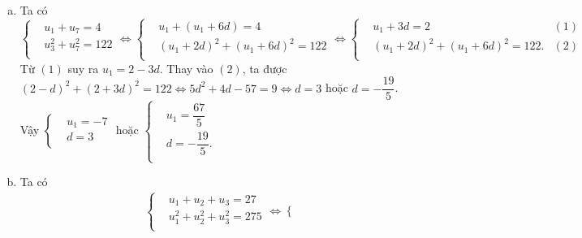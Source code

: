 \begin{bt}
{\begin{enumerate}[a)]
			Vậy $\left\{\begin{aligned} 
				&u_1=-1 \\
				&d=4 \\
			\end{aligned}\right. $ hoặc $\left\{\begin{aligned} 
				&u_1=7 \\
				&d=-4. \\
			\end{aligned}\right. $ 
			\item Ta có\\ $\left\{\begin{aligned} 
				&u_1+u_7=4 \\
				&u_3^2+u_7^2=122 \\
			\end{aligned}\right. \Leftrightarrow \left\{\begin{aligned} 
				&u_1+(u_1+6d)=4 \\
				&{(u_1+2d)}^2+{(u_1+6d)}^2=122 \\
			\end{aligned}\right. \Leftrightarrow \left\{\begin{aligned}& u_1+3d=2 & (1) \\ & {(u_1+2d)}^2+{(u_1+6d)}^2=122. & (2) \\ \end{aligned}\right. $\\
			Từ $(1)$ suy ra $u_1=2-3d$. Thay vào $(2)$, ta được \\
			$(2-d)^2+(2+3d)^2=122 \Leftrightarrow 5d^2+4d-57=9 \Leftrightarrow d=3$ hoặc $d=-\dfrac{19}{5}$. \\
			Vậy $\left\{\begin{aligned} 
				&u_1=-7 \\
				&d=3 \\
			\end{aligned}\right. $ hoặc $\left\{\begin{aligned} 
				&u_1=\dfrac{67}{5} \\
				&d=-\dfrac{19}{5}. \\
			\end{aligned}\right. $ 
			\item Ta có
			\begin{eqnarray*}
				& &    \left\{\begin{aligned} 
					&u_1+u_2+u_3=27 \\
					&u_1^2+u_2^2+u_3^2=275 \\
				\end{aligned}\right. \Leftrightarrow \left\{\begin{aligned} 

\end{aligned}
\end{eqnarray*}
\end{enumerate}}
\end{bt}
